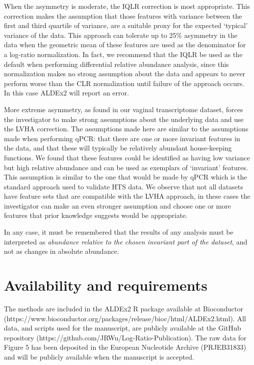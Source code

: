 \documentclass{bmcart}
\begin{document}
When the asymmetry is moderate, the IQLR correction is most appropriate. This correction makes the assumption that those features with variance between the first and third quartile of variance, are a suitable proxy for the expected `typical' variance of the data. This approach can tolerate up to 25\% asymmetry in the data when the geometric mean of these features are used as the denominator for a log-ratio normalization. In fact, we recommend that the IQLR be used as the default when performing differential relative abundance analysis, since this normalization makes no strong assumption about the data and appears to never perform worse than the CLR normalization until failure of the approach occurs. In this case ALDEx2 will report an error.

More extreme asymmetry, as found in our vaginal transcriptome dataset, forces the investigator to make strong assumptions about the underlying data and use the LVHA correction. The assumptions made here are similar to the assumptions made when performing qPCR: that there are one or more invariant features in the data, and that these will typically be relatively abundant house-keeping functions. We found that these features could be identified as having low variance but high relative abundance and can be used as exemplars of `invariant' features. This assumption is similar to the one that would be made by qPCR which is the standard approach used to validate HTS data. We observe that not all datasets have feature sets that are compatible with the LVHA approach, in these cases the investigator can make an even stronger assumption and choose one or more features that prior knowledge suggests would be appropriate. 

In any case, it must be remembered that the results of any analysis must be interpreted as \emph{abundance relative to the chosen invariant part of the dataset}, and not as changes in absolute abundance.

\section{Availability and requirements}

The methods are included in the ALDEx2 R package available at Bioconductor (https://www.bioconductor.org/packages/release/bioc/html/ALDEx2.html). All data, and scripts used for the manuscript, are publicly available at the GitHub repository (https://github.com/JRWu/Log-Ratio-Publication). The raw data for Figure 5 has been deposited in the European Nucleotide Archive (PRJEB31833) and will be publicly available when the manuscript is accepted. 
\end{document}
